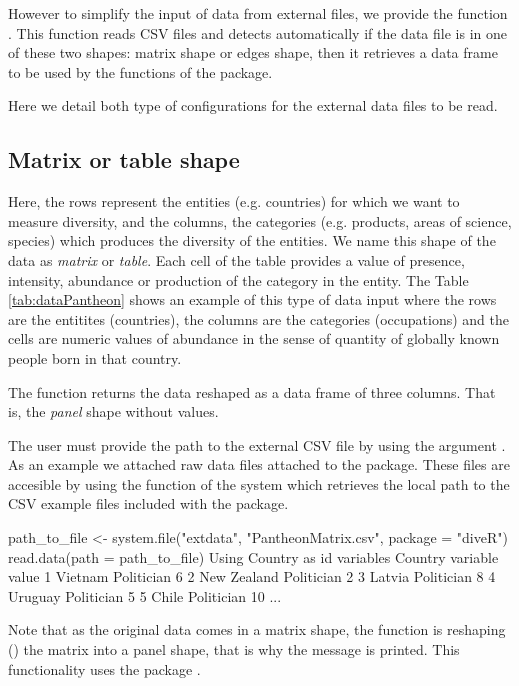 However to simplify the input of data from external files, we provide the function . This function reads CSV files and detects automatically if the data file is in one of these two shapes: matrix shape or edges shape, then it retrieves a data frame to be used by the functions of the package.

Here we detail both type of configurations for the external data files to be read.

\subsection{Matrix or table shape}
 Here, the rows represent the entities (e.g. countries) for which we want to measure diversity, and the columns, the categories (e.g. products, areas of science, species) which produces the diversity of the entities. We name this shape of the data as \emph{matrix} or \emph{table}. Each cell of the table provides a value of presence, intensity, abundance or production of the category in the entity. The Table \ref{tab:dataPantheon} shows an example of this type of data input where the rows are the entitites (countries), the columns are the categories (occupations) and the cells are numeric values of abundance in the sense of quantity of globally known people born in that country.
  
  
  
  The function  returns the data reshaped as a data frame of three columns. That is, the \emph{panel} shape without  values.
  
  The user must provide the path to the external CSV file by using the argument . As an example we attached raw data files attached to the package. These files are accesible by using the function of the system  which retrieves the local path to the CSV example files included with the package.
  
  \begin{example}
 path_to_file <- system.file("extdata", "PantheonMatrix.csv", package = "diveR")
 read.data(path = path_to_file)
 Using Country as id variables
         Country            variable value
1        Vietnam          Politician     6
2    New Zealand          Politician     2
3         Latvia          Politician     8
4        Uruguay          Politician     5
5          Chile          Politician    10
...
\end{example}

Note that as the original data comes in a matrix shape, the function  is reshaping () the matrix into a panel shape, that is why the message  is printed. This functionality uses the package .


